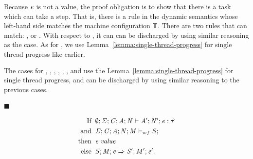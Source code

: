 \begin{bproof}
\begin{bcase}[\tdataconivars, $\;\EXPR = \datacon{\DC}{\keywd{\locreg{\loc}{\reg}}}{\overharpoon{\VAL}}$]

\end{bcase}



\begin{bcase}[\tcase, $\;\EXPR = \case{\VAL}{\overharpoon{\pat} : \tyatlocreg{\TYP}{\loc}{\reg}}$]

Because $\mathit{e}$ is not a value, the proof obligation is to show that there is a task which
can take a step. That is, there is a rule in the dynamic semantics whose
left-hand side matches the machine configuration $\mathbb{T}$.
%
There are two rules that can match: \dregparcasejoin{}, or \dparsteptask{}.
%
With respect to \dregparcasejoin{}, it can can be discharged by using similar reasoning
as the \tdataconivars{} case.
%
As for \dparsteptask{}, we use Lemma~\ref{lemma:single-thread-progress}
for single thread progress like earlier.

\end{bcase}

\begin{bcase}

The cases for \tdatacon{}, \tlregion{}, \tlltag{}, \tllstart{}, \tllafter{}, \tvar{}, and \tconcreteloc{}
use the Lemma~\ref{lemma:single-thread-progress}
for single thread progress, and can be discharged by using similar reasoning to
the previous cases.

\end{bcase}

$\blacksquare$

\end{bproof}


\begin{lemma}
\label{lemma:single-thread-progress}
\begin{displaymath}
  \begin{aligned}
  \text{If} \;\; & \emptyset;\mathit{\Sigma};\mathit{C};\mathit{A};\mathit{N} \vdash \mathit{A}';\mathit{N}';\mathit{e} : \mathit{\hat{\tau}} \\
  \text{and} \;\; & \mathit{\Sigma};\mathit{C};\mathit{A};\mathit{N};\mathit{M} \vdash_{wf} \mathit{S};\\
  \text{then} \;\; & \mathit{e} \; \mathit{value} \\
  \text{else} \;\; & \mathit{S};\mathit{M};\mathit{e} \Rightarrow \mathit{S}';\mathit{M}';\mathit{e}'.
  \end{aligned}
\end{displaymath}
\end{lemma}

